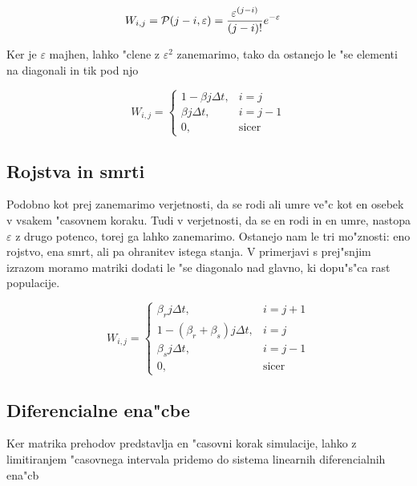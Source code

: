 \documentclass[a4paper,10pt]{article}
\newcommand{\eps}{\varepsilon}
\begin{document}
\begin{align}
  W_{i,j} &= \mathcal{P}(j-i, \eps) = \poisson{(j-i)}{\eps}
\end{align}

Ker je $\eps$ majhen, lahko "clene z $\eps^2$ zanemarimo, tako da ostanejo le "se elementi na diagonali in tik pod njo

\begin{equation}
  W_{i,j} = \left\{ \begin{matrix} 
		      1 - \beta j \Delta t, & i=j \\
                      \beta j \Delta t, & i=j-1 \\
		      0, & \mathrm{sicer}
                    \end{matrix}\right.
\end{equation}

\subsection{Rojstva in smrti}

Podobno kot prej zanemarimo verjetnosti, da se rodi ali umre ve"c kot en osebek v vsakem "casovnem koraku. Tudi v verjetnosti, da se en rodi in en umre, nastopa $\eps$ z drugo potenco, torej ga lahko zanemarimo. Ostanejo nam le tri mo"znosti: eno rojstvo, ena smrt, ali pa ohranitev istega stanja. V primerjavi s prej"snjim izrazom moramo matriki dodati le "se diagonalo nad glavno, ki dopu"s"ca rast populacije. 

\begin{equation}
  W_{i,j} = \left\{ \begin{matrix} 
                      \beta_r j \Delta t, & i=j+1 \\
		      1 - (\beta_r+\beta_s) j \Delta t, & i=j \\
                      \beta_s j \Delta t, & i=j-1 \\
		      0, & \mathrm{sicer}
                    \end{matrix}\right.
\end{equation}

\subsection{Diferencialne ena"cbe}

Ker matrika prehodov predstavlja en "casovni korak simulacije, lahko z limitiranjem "casovnega intervala pridemo do sistema linearnih diferencialnih ena"cb
\end{document}
